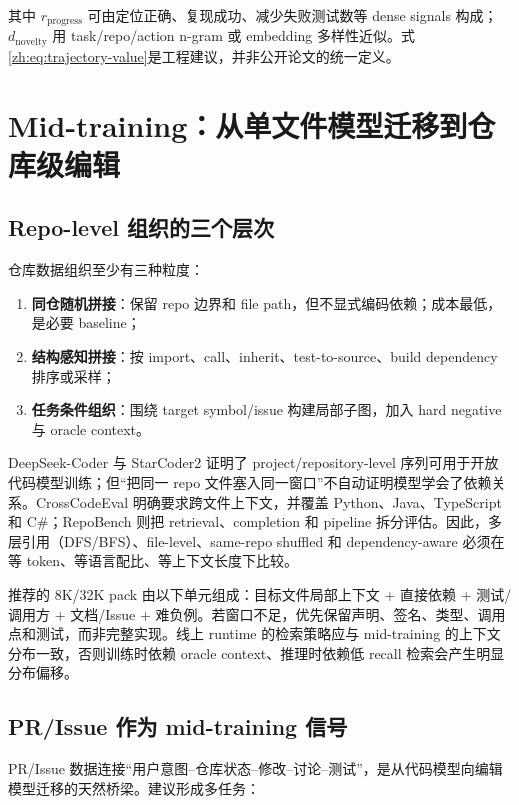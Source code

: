 \documentclass[10pt,a4paper,UTF8,fontset=none]{ctexart}
\begin{document}
其中 $r_{\mathrm{progress}}$ 可由定位正确、复现成功、减少失败测试数等 dense signals 构成；$d_{\mathrm{novelty}}$ 用 task/repo/action n-gram 或 embedding 多样性近似。式\eqref{zh:eq:trajectory-value}是工程建议，并非公开论文的统一定义。

\section{Mid-training：从单文件模型迁移到仓库级编辑}

\subsection{Repo-level 组织的三个层次}

仓库数据组织至少有三种粒度：

\begin{enumerate}
  \item \textbf{同仓随机拼接}：保留 repo 边界和 file path，但不显式编码依赖；成本最低，是必要 baseline；
  \item \textbf{结构感知拼接}：按 import、call、inherit、test-to-source、build dependency 排序或采样；
  \item \textbf{任务条件组织}：围绕 target symbol/issue 构建局部子图，加入 hard negative 与 oracle context。
\end{enumerate}

DeepSeek-Coder 与 StarCoder2 证明了 project/repository-level 序列可用于开放代码模型训练\cite{zh:guo2024deepseekcoder,zh:lozhkov2024starcoder2}；但“把同一 repo 文件塞入同一窗口”不自动证明模型学会了依赖关系。CrossCodeEval 明确要求跨文件上下文，并覆盖 Python、Java、TypeScript 和 C\#\cite{zh:ding2023crosscodeeval}；RepoBench 则把 retrieval、completion 和 pipeline 拆分评估\cite{zh:liu2023repobench}。因此，多层引用（DFS/BFS）、file-level、same-repo shuffled 和 dependency-aware 必须在等 token、等语言配比、等上下文长度下比较。

推荐的 8K/32K pack 由以下单元组成：目标文件局部上下文 + 直接依赖 + 测试/调用方 + 文档/Issue + 难负例。若窗口不足，优先保留声明、签名、类型、调用点和测试，而非完整实现。线上 runtime 的检索策略应与 mid-training 的上下文分布一致，否则训练时依赖 oracle context、推理时依赖低 recall 检索会产生明显分布偏移。

\subsection{PR/Issue 作为 mid-training 信号}

PR/Issue 数据连接“用户意图--仓库状态--修改--讨论--测试”，是从代码模型向编辑模型迁移的天然桥梁。建议形成多任务：
\end{document}
